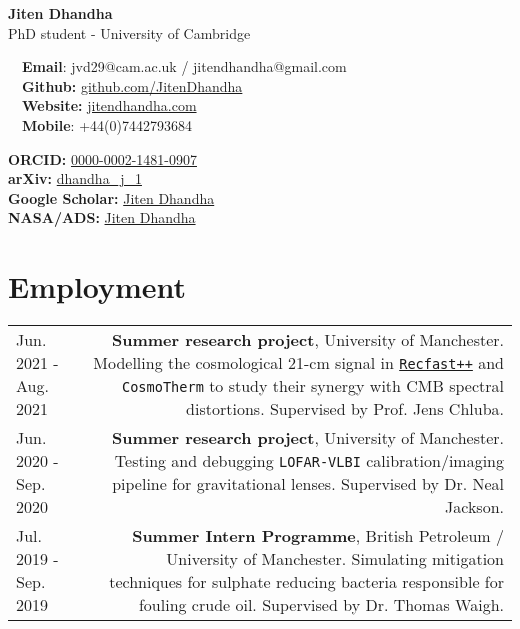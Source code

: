 \documentclass{article}
\begin{document}
\small %

\begin{center}
\huge
\textbf{Jiten Dhandha} \\
\normalsize
PhD student - University of Cambridge
\end{center}

\begin{minipage}[ht]{0.6\linewidth}
	\faEnvelope~~\textbf{Email}: jvd29@cam.ac.uk / jitendhandha@gmail.com\\
	\faGithub~~\textbf{Github:} \href{https://github.com/JitenDhandha}{github.com/JitenDhandha}\\
	\faGlobe~~\textbf{Website:} \href{https://jitendhandha.com}{jitendhandha.com} \\
  \faPhone~~\textbf{Mobile}: +44(0)7442793684 \\
\end{minipage}
\begin{minipage}[ht]{0.3\linewidth}
	\begin{flushright}
    \textbf{ORCID:} \href{https://orcid.org/0000-0002-1481-0907}{0000-0002-1481-0907} \\
    \textbf{arXiv:} \href{https://arxiv.org/a/dhandha_j_1.html}{dhandha\_j\_1} \\
    \textbf{Google Scholar:} \href{https://scholar.google.com/citations?user=RjlmcA0AAAAJ}{Jiten Dhandha} \\
    \textbf{NASA/ADS:} \href{https://ui.adsabs.harvard.edu/search/?q=author%3A%22Dhandha%2C+Jiten%22}{Jiten Dhandha}
	\end{flushright}
\end{minipage}

\section*{Employment}
\begin{tabular}{L!{\vrule}R}
    Jun. 2021 - Aug. 2021 & \textbf{Summer research project}, University of Manchester. Modelling the cosmological 21-cm signal in \href{https://bitbucket.org/Jacetoto/recfast-.vx/src/Recfast_JD_21cm_modelling/}{\texttt{Recfast++}} and \texttt{CosmoTherm} to study their synergy with CMB spectral distortions. Supervised by Prof. Jens Chluba. \\
    Jun. 2020 - Sep. 2020 & \textbf{Summer research project}, University of Manchester. Testing and debugging \texttt{LOFAR-VLBI} calibration/imaging pipeline for gravitational lenses. Supervised by Dr. Neal Jackson.\\
    Jul. 2019 - Sep. 2019 & \textbf{Summer Intern Programme}, British Petroleum / University of Manchester. Simulating mitigation techniques for sulphate reducing bacteria responsible for fouling crude oil. Supervised by Dr. Thomas Waigh. \\
\end{tabular}
\end{document}
